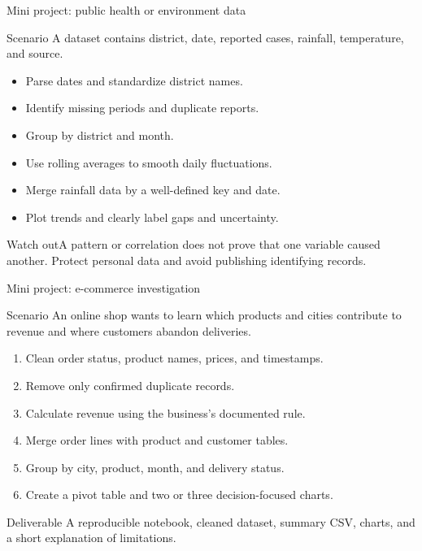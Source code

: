 \documentclass[aspectratio=169,10pt]{beamer}
\newcommand{\pitfall}[1]{\begin{alertblock}{Watch out}#1\end{alertblock}}
\begin{document}
\begin{frame}[fragile]{Mini project: public health or environment data}
\begin{block}{Scenario}
A dataset contains district, date, reported cases, rainfall, temperature, and source.
\end{block}
\begin{itemize}
\item Parse dates and standardize district names.
\item Identify missing periods and duplicate reports.
\item Group by district and month.
\item Use rolling averages to smooth daily fluctuations.
\item Merge rainfall data by a well-defined key and date.
\item Plot trends and clearly label gaps and uncertainty.
\end{itemize}
\pitfall{A pattern or correlation does not prove that one variable caused another. Protect personal data and avoid publishing identifying records.}
\end{frame}

\begin{frame}[fragile]{Mini project: e-commerce investigation}
\begin{block}{Scenario}
An online shop wants to learn which products and cities contribute to revenue and where customers abandon deliveries.
\end{block}
\begin{enumerate}
\item Clean order status, product names, prices, and timestamps.
\item Remove only confirmed duplicate records.
\item Calculate revenue using the business's documented rule.
\item Merge order lines with product and customer tables.
\item Group by city, product, month, and delivery status.
\item Create a pivot table and two or three decision-focused charts.
\end{enumerate}
\begin{block}{Deliverable}
A reproducible notebook, cleaned dataset, summary CSV, charts, and a short explanation of limitations.
\end{block}
\end{frame}
\end{document}
